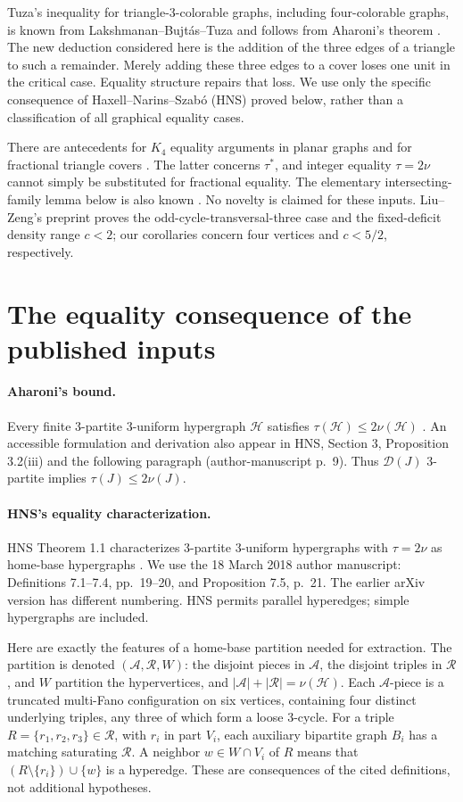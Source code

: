\documentclass[11pt]{article}
\newcommand{\D}{\mathcal D}
\begin{document}
Tuza's inequality for triangle-3-colorable graphs, including four-colorable
graphs, is known from Lakshmanan--Bujt\'as--Tuza \cite{LBT} and follows from
Aharoni's theorem \cite{Aharoni}. The new deduction considered here is the
addition of the three edges of a triangle to such a remainder. Merely
adding these three edges to a cover loses one unit in the critical case.
Equality structure repairs that loss. We use only the specific consequence
of Haxell--Narins--Szab\'o (HNS) \cite{HNS} proved below, rather than a
classification of all graphical equality cases.

There are antecedents for $K_4$ equality arguments in planar graphs
\cite{CHM} and for fractional triangle covers \cite{HKT}. The latter concerns
$\tau^*$, and integer equality $\tau=2\nu$ cannot simply be substituted for
fractional equality. The elementary intersecting-family lemma below is also
known \cite{AZ}. No novelty is claimed for these inputs. Liu--Zeng's
preprint \cite{LZ} proves the odd-cycle-transversal-three case and the
fixed-deficit density range $c<2$; our corollaries concern four vertices and
$c<5/2$, respectively.

\section{The equality consequence of the published inputs}
\paragraph{Aharoni's bound.}
Every finite 3-partite 3-uniform hypergraph $\mathcal H$ satisfies
$\tau(\mathcal H)\le2\nu(\mathcal H)$ \cite{Aharoni}.
An accessible formulation and derivation also appear in HNS, Section 3,
Proposition 3.2(iii) and the following paragraph (author-manuscript p.~9).
Thus $\D(J)$ 3-partite implies $\tau(J)\le2\nu(J)$.

\paragraph{HNS's equality characterization.}
HNS Theorem 1.1 characterizes 3-partite 3-uniform hypergraphs with
$\tau=2\nu$ as home-base hypergraphs \cite{HNS}. We use the 18 March 2018
author manuscript: Definitions 7.1--7.4, pp.~19--20, and Proposition 7.5,
p.~21. The earlier arXiv version has different numbering. HNS permits
parallel hyperedges; simple hypergraphs are included.

Here are exactly the features of a home-base partition needed for extraction.
The partition is denoted $(\mathcal A,\mathcal R,W)$: the disjoint pieces
in $\mathcal A$, the disjoint triples in $\mathcal R$, and $W$ partition
the hypervertices, and $|\mathcal A|+|\mathcal R|=\nu(\mathcal H)$.
Each $\mathcal A$-piece is a truncated multi-Fano configuration on six
vertices, containing four distinct underlying triples, any three of which
form a loose 3-cycle. For a triple $R=\{r_1,r_2,r_3\}\in\mathcal R$,
with $r_i$ in part $V_i$, each auxiliary bipartite graph $B_i$ has a
matching saturating $\mathcal R$. A neighbor $w\in W\cap V_i$ of $R$
means that $(R\setminus\{r_i\})\cup\{w\}$ is a hyperedge.
These are consequences of the cited definitions, not additional hypotheses.
\end{document}
